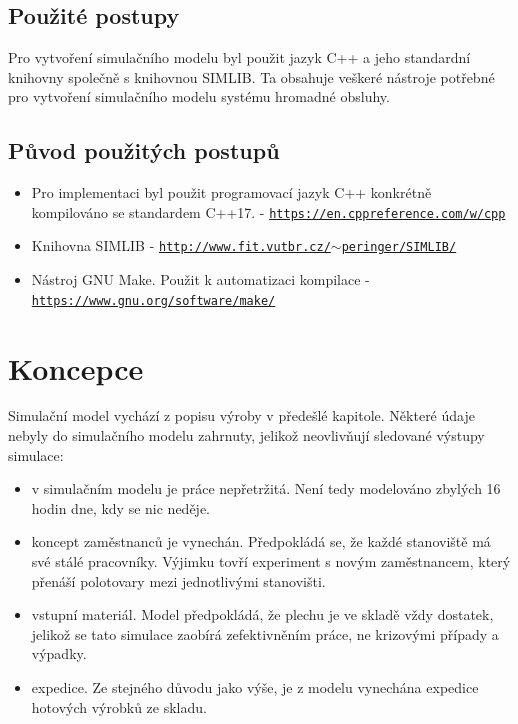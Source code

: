 \documentclass[11pt, a4paper]{article}
\begin{document}
\subsection{Použité postupy}
Pro vytvoření simulačního modelu byl použit jazyk C++ a jeho standardní knihovny společně s knihovnou SIMLIB\cite{simlib}. Ta obsahuje veškeré nástroje potřebné pro vytvoření simulačního modelu systému hromadné obsluhy\cite[str. 136]{ims}.
\subsection{Původ použitých postupů}
\begin{itemize}
    \item Pro implementaci byl použit programovací jazyk C++ konkrétně kompilováno se standardem C++17. - \href{https://en.cppreference.com/w/cpp}{\texttt{https://en.cppreference.com/w/cpp}}
    \item Knihovna SIMLIB -  \href{http://www.fit.vutbr.cz/~peringer/SIMLIB/}{\texttt{http://www.fit.vutbr.cz/$\sim$peringer/SIMLIB/}}
    \item Nástroj GNU Make. Použit k automatizaci kompilace -  \href{https://www.gnu.org/software/make/}{\texttt{https://www.gnu.org/software/make/}}
\end{itemize}

\section{Koncepce}

Simulační model vychází z popisu výroby v předešlé kapitole. Některé údaje nebyly do simulačního modelu zahrnuty, jelikož neovlivňují sledované výstupy simulace:
\begin{itemize}
    \item v simulačním modelu je práce nepřetržitá. Není tedy modelováno zbylých 16 hodin dne, kdy se nic neděje.
    \item koncept zaměstnanců je vynechán. Předpokládá se, že každé stanoviště má své stálé pracovníky. Výjimku tovří experiment s novým zaměstnancem, který přenáší polotovary mezi jednotlivými stanovišti.
    \item vstupní materiál. Model předpokládá, že plechu je ve skladě vždy dostatek, jelikož se tato simulace zaobírá zefektivněním práce, ne krizovými případy a výpadky.
    \item expedice. Ze stejného důvodu jako výše, je z modelu vynechána expedice hotových výrobků ze skladu.
\end{itemize}
\end{document}
